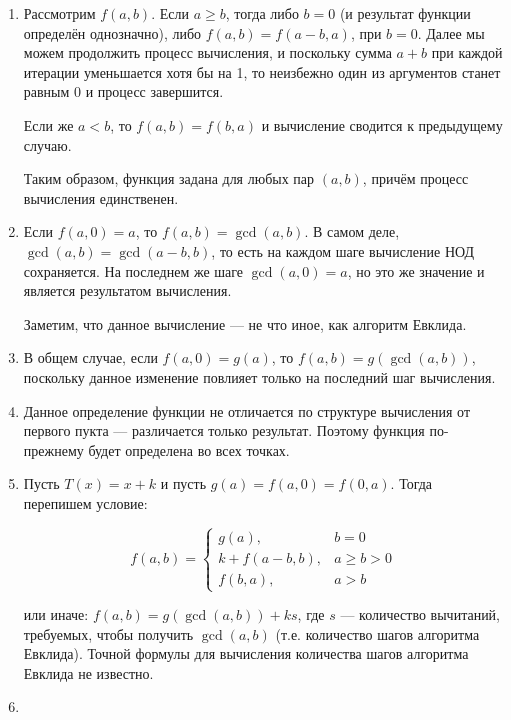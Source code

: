 
\begin{enumerate}
\item Рассмотрим $f(a,b)$. Если $a \ge b$, тогда либо $b = 0$ (и результат функции определён однозначно),
либо $f(a,b) = f(a-b,a)$, при $b = 0$. Далее мы можем продолжить процесс вычисления, и поскольку
сумма $a+b$ при каждой итерации уменьшается хотя бы на 1, то неизбежно один из аргументов
станет равным $0$ и процесс завершится. 

Если же $a < b$, то $f(a,b) = f(b,a)$ и вычисление сводится к предыдущему случаю.

Таким образом, функция задана для любых пар $(a,b)$, причём процесс вычисления единственен.

\item Если $f(a,0) = a$, то $f(a,b) = \gcd(a,b)$.
В самом деле, $\gcd(a,b) = \gcd(a-b,b)$, то есть на каждом шаге вычисление НОД сохраняется.
На последнем же шаге $\gcd(a,0) = a$, но это же значение и является результатом вычисления.

Заметим, что данное вычисление --- не что иное, как алгоритм Евклида.

\item В общем случае, если $f(a,0) = g(a)$, то $f(a,b) = g(\gcd(a,b))$, поскольку данное 
изменение повлияет только на последний шаг вычисления.

\item Данное определение функции не отличается по структуре вычисления от первого пукта ---
различается только результат. Поэтому функция по-прежнему будет определена во всех точках.

\item Пусть $T(x) = x + k$ и пусть $g(a) = f(a,0) = f(0,a)$. Тогда перепишем условие:

$$f(a,b) = \left\{\begin{array}{ll}
   g(a), & b = 0\\
   k+f(a-b,b), & a \ge b > 0\\
   f(b,a), & a > b\end{array}\right.$$

или иначе: $f(a,b) = g(\gcd(a,b)) + ks$, где $s$ --- количество вычитаний, требуемых,
чтобы получить $\gcd(a,b)$ (т.е. количество шагов алгоритма Евклида). Точной формулы
для вычисления количества шагов алгоритма Евклида не известно.

\item 
\end{enumerate}